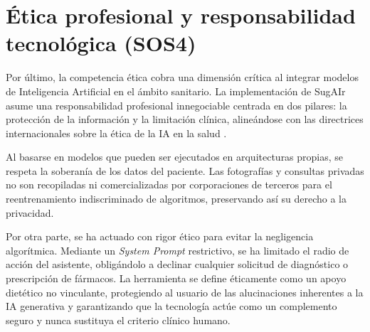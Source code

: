 \section{Ética profesional y responsabilidad tecnológica (SOS4)}
Por último, la competencia ética cobra una dimensión crítica al integrar modelos de Inteligencia Artificial en el ámbito sanitario. La implementación de SugAIr asume una responsabilidad profesional innegociable centrada en dos pilares: la protección de la información y la limitación clínica, alineándose con las directrices internacionales sobre la ética de la IA en la salud \cite{who2021ai}.

Al basarse en modelos que pueden ser ejecutados en arquitecturas propias, se respeta la soberanía de los datos del paciente. Las fotografías y consultas privadas no son recopiladas ni comercializadas por corporaciones de terceros para el reentrenamiento indiscriminado de algoritmos, preservando así su derecho a la privacidad.

Por otra parte, se ha actuado con rigor ético para evitar la negligencia algorítmica. Mediante un \textit{System Prompt} restrictivo, se ha limitado el radio de acción del asistente, obligándolo a declinar cualquier solicitud de diagnóstico o prescripción de fármacos. La herramienta se define éticamente como un apoyo dietético no vinculante, protegiendo al usuario de las alucinaciones inherentes a la IA generativa y garantizando que la tecnología actúe como un complemento seguro y nunca sustituya el criterio clínico humano.